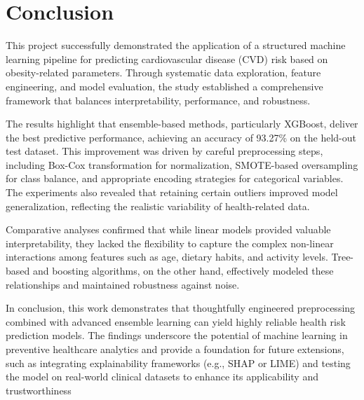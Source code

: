 \documentclass[12pt,a4paper]{report}
\begin{document}
    
    
    
    
    
    
    

    {
        \chapter*{Conclusion}
        This project successfully demonstrated the application of a structured machine learning pipeline for predicting cardiovascular disease (CVD) risk based on obesity-related parameters.
        Through systematic data exploration, feature engineering, and model evaluation, the study established a comprehensive framework that balances interpretability, performance, and robustness.

        The results highlight that ensemble-based methods, particularly XGBoost, deliver the best predictive performance, achieving an accuracy of 93.27\% on the held-out test dataset.
        This improvement was driven by careful preprocessing steps, including Box-Cox transformation for normalization, SMOTE-based oversampling for class balance, and appropriate encoding strategies for categorical variables.
        The experiments also revealed that retaining certain outliers improved model generalization, reflecting the realistic variability of health-related data.

        Comparative analyses confirmed that while linear models provided valuable interpretability, they lacked the flexibility to capture the complex non-linear interactions among features such as age, dietary habits, and activity levels.
        Tree-based and boosting algorithms, on the other hand, effectively modeled these relationships and maintained robustness against noise.

        In conclusion, this work demonstrates that thoughtfully engineered preprocessing combined with advanced ensemble learning can yield highly reliable health risk prediction models.
        The findings underscore the potential of machine learning in preventive healthcare analytics and provide a foundation for future extensions, such as integrating explainability frameworks (e.g., SHAP or LIME) and testing the model on real-world clinical datasets to enhance its applicability and trustworthiness
    }
\end{document}
